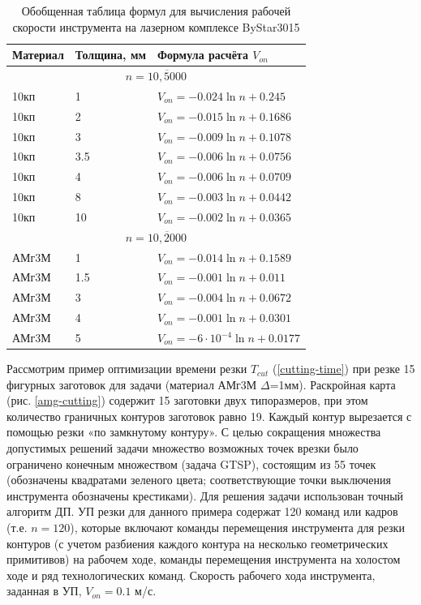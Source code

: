 \documentclass{article}
\begin{document}
\begin{table}
  \begin{tabular}{lll}
    Материал & Толщина, мм & Формула расчёта $V_{on}$ \\
    \hline
    \multicolumn{3}{c}{$n=\overline{10,5000}$} \\
    10кп & 1 & $V_{on} = -0.024 \ln n+0.245$ \\
    10кп & 2 & $V_{on} = -0.015 \ln n+0.1686$ \\
    10кп & 3 & $V_{on} = -0.009 \ln n+0.1078$ \\
    10кп & 3.5 & $V_{on} = -0.006 \ln n+0.0756$ \\
    10кп & 4 & $V_{on} = -0.006 \ln n+0.0709$ \\
    10кп & 8 & $V_{on} = -0.003 \ln n+0.0442$ \\
    10кп & 10 & $V_{on} = -0.002 \ln n+0.0365$ \\
    \multicolumn{3}{c}{$n=\overline{10,2000}$} \\
    АМг3М & 1 & $V_{on} = -0.014 \ln n+0.1589$ \\
    АМг3М & 1.5 & $V_{on} = -0.001 \ln n+0.011$ \\
    АМг3М & 3 & $V_{on} = -0.004 \ln n+0.0672$ \\
    АМг3М & 4 & $V_{on} = -0.001 \ln n+0.0301$ \\
    АМг3М & 5 & $V_{on} = -6\cdot 10^{-4} \ln n+0.0177$ \\
  \end{tabular}
  \label{v-formulae}
  \caption{Обобщенная таблица формул для вычисления рабочей скорости инструмента на лазерном комплексе ByStar3015}
\end{table}

Рассмотрим пример оптимизации времени резки
$T_{cut}$
(\ref{cutting-time})
при резке 15 фигурных заготовок для задачи
(материал АМг3М $\Delta$=1мм).
Раскройная карта (рис. \ref{amg-cutting})
содержит 15 заготовки двух типоразмеров,
при этом количество граничных контуров заготовок равно 19.
Каждый контур вырезается с помощью резки
«по замкнутому контуру».
С целью сокращения множества допустимых решений
задачи множество возможных точек врезки было
ограничено конечным множеством (задача GTSP),
состоящим из 55 точек
(обозначены квадратами зеленого цвета;
соответствующие точки выключения инструмента обозначены крестиками).
Для решения задачи использован точный алгоритм ДП.
УП резки для данного примера содержат 120 команд или кадров
(т.е. $n=120$),
которые включают команды перемещения инструмента
для резки контуров
(с учетом разбиения каждого контура на несколько геометрических примитивов)
на рабочем ходе,
команды перемещения инструмента на холостом ходе
и ряд технологических команд.
Скорость рабочего хода инструмента, заданная в УП,
$V_{on}=0.1$ м/с.
\end{document}
